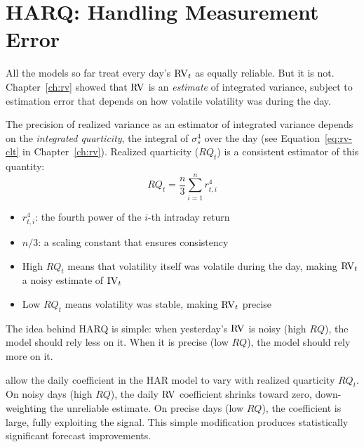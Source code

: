 \section{HARQ: Handling Measurement Error}
\label{sec:harq}

All the models so far treat every day's $\operatorname{RV}_t$ as equally reliable.
But it is not.
Chapter~\ref{ch:rv} showed that $\operatorname{RV}$ is an \emph{estimate} of integrated variance, subject to estimation error that depends on how volatile volatility was during the day.

\begin{prereq}
The precision of realized variance as an estimator of integrated variance depends on the \emph{integrated quarticity}, the integral of $\sigma^4_s$ over the day (see Equation~\ref{eq:rv-clt} in Chapter~\ref{ch:rv}).
Realized quarticity ($RQ_t$) is a consistent estimator of this quantity:
\begin{equation}
  RQ_t = \frac{n}{3} \sum_{i=1}^{n} r^4_{t,i}
  \label{eq:rq}
\end{equation}
\begin{itemize}[nosep]
  \item $r^4_{t,i}$: the fourth power of the $i$-th intraday return
  \item $n/3$: a scaling constant that ensures consistency
  \item High $RQ_t$ means that volatility itself was volatile during the day, making $\operatorname{RV}_t$ a noisy estimate of $\operatorname{IV}_t$
  \item Low $RQ_t$ means volatility was stable, making $\operatorname{RV}_t$ precise
\end{itemize}
\end{prereq}

The idea behind HARQ is simple: when yesterday's $\operatorname{RV}$ is noisy (high $RQ$), the model should rely less on it.
When it is precise (low $RQ$), the model should rely more on it.

\begin{keyresult}
\citet{BPQ2016} allow the daily coefficient in the HAR model to vary with realized quarticity $RQ_t$.
On noisy days (high $RQ$), the daily $\operatorname{RV}$ coefficient shrinks toward zero, down-weighting the unreliable estimate.
On precise days (low $RQ$), the coefficient is large, fully exploiting the signal.
This simple modification produces statistically significant forecast improvements.
\end{keyresult}

